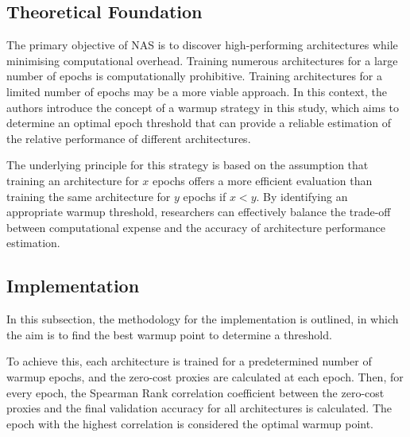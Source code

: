 \subsection{Theoretical Foundation}

The primary objective of NAS is to discover high-performing architectures while minimising computational overhead. Training numerous architectures for a large number of epochs is computationally prohibitive. Training architectures for a limited number of epochs may be a more viable approach. In this context, the authors introduce the concept of a warmup strategy in this study, which aims to determine an optimal epoch threshold that can provide a reliable estimation of the relative performance of different architectures.

The underlying principle for this strategy is based on the assumption that training an architecture for $x$ epochs offers a more efficient evaluation than training the same architecture for $y$ epochs if $x < y$. By identifying an appropriate warmup threshold, researchers can effectively balance the trade-off between computational expense and the accuracy of architecture performance estimation.


\subsection{Implementation}
In this subsection, the methodology for the implementation is outlined, in which the aim is to find the best warmup point to determine a threshold. 

To achieve this, each architecture is trained for a predetermined number of warmup epochs, and the zero-cost proxies are calculated at each epoch. Then, for every epoch, the Spearman Rank correlation coefficient between the zero-cost proxies and the final validation accuracy for all architectures is calculated. The epoch with the highest correlation is considered the optimal warmup point. 

\begin{comment}
    
By combining the warmup concept with zero-cost proxies in the project, one can take advantage of early training dynamics to improve the accuracy and reliability of performance estimation. This improved performance prediction allows for more efficient exploration and use of the search space in NAS, ultimately leading to better architectures with lower search costs.
\end{comment}

